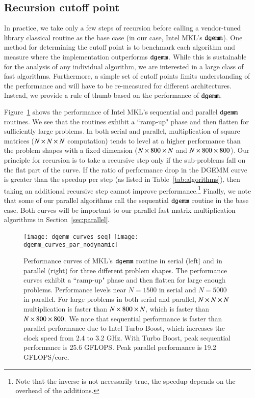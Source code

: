\documentclass[preprint]{sigplanconf}
\begin{document}
\subsection{Recursion cutoff point}
\label{sec:recursion_cutoff}

In practice, we take only a few steps of recursion before calling a vendor-tuned library classical routine as the base case (in our case, Intel MKL's $\texttt{dgemm}$).
One method for determining the cutoff point is to benchmark each algorithm and measure where the implementation
outperforms $\texttt{dgemm}$.
While this is sustainable for the analysis of any individual algorithm, we are interested in a large class of fast algorithms.
Furthermore, a simple set of cutoff points limits understanding of the performance and will have to be re-measured for different architectures.
Instead, we provide a rule of thumb based on the performance of $\texttt{dgemm}$.

Figure~\ref{fig:dgemm_curves} shows the performance of Intel MKL's sequential and parallel $\texttt{dgemm}$ routines.
We see that the routines exhibit a ``ramp-up" phase and then flatten for sufficiently large problems.
In both serial and parallel, multiplication of square matrices ($N \times N \times N$ computation) tends to level at a higher performance than
the problem shapes with a fixed dimension ($N \times 800 \times N$ and $N \times 800 \times 800$).
Our principle for recursion is to take a recursive step only if the sub-problems fall on the flat part of the curve.
If the ratio of performance drop in the DGEMM curve is greater than the speedup per step (as listed in Table~\ref{tab:algorithms}),
then taking an additional recursive step cannot improve performance.\footnote{Note that the inverse is not necessarily true, the speedup depends on the overhead of the additions.}
Finally, we note that some of our parallel algorithms call the sequential $\texttt{dgemm}$ routine in the base case.
Both curves will be important to our parallel fast matrix multiplication algorithms in Section~\ref{sec:parallel}.

\begin{figure*}[tb]
\centering
\texttt{[image: dgemm\_curves\_seq]} 
\texttt{[image: dgemm\_curves\_par\_nodynamic]}
\caption{
Performance curves of MKL's $\texttt{dgemm}$ routine in serial (left) and in parallel (right) for three different problem shapes.
The performance curves exhibit a ``ramp-up" phase and then flatten for large enough problems.
Performance levels near $N = 1500$ in serial and $N = 5000$ in parallel.
For large problems in both serial and parallel, $N \times N \times N$ multiplication is faster than $N \times 800 \times N$, which is faster than $N \times 800 \times 800$.
We note that sequential performance is faster than parallel performance due to Intel Turbo Boost, which increases the clock speed from 2.4 to 3.2 GHz.
With Turbo Boost, peak sequential performance is 25.6 GFLOPS.
Peak parallel performance is 19.2 GFLOPS/core.
}
\label{fig:dgemm_curves}
\end{figure*}
\end{document}
